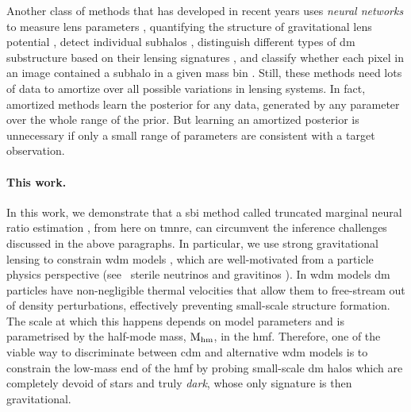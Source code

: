 Another class of methods that has developed in recent years uses \emph{neural networks} to measure lens parameters \cite{Hezaveh:2017sht, PerreaultLevasseur:2017ltk,  Morningstar:2019szx}, quantifying the structure of gravitational lens potential \cite{Vernardos:2020aa}, detect individual subhalos \cite{Rivero:2020aa}, distinguish different types of \gls*{dm} substructure based on their lensing signatures \cite{Alexander:2019puy}, and classify whether each pixel in an image contained a subhalo in a given mass bin \cite{Ostdiek:2020cqz,Ostdiek:2020mvo}. Still, these methods need lots of data to amortize over all possible variations in lensing systems. In fact, amortized methods learn the posterior for any data, generated by any parameter over the whole range of the prior. But learning an amortized posterior is unnecessary if only a small range of parameters are consistent with a target observation.
 

\paragraph*{This work.} In this work, we demonstrate that a \gls*{sbi} \cite{Cranmer:2019eaq} method called truncated marginal neural ratio estimation \cite{Miller:2020hua,Miller:2021aa}, from here on \gls*{tmnre}, can circumvent the inference challenges discussed in the above paragraphs. 
In particular, we use strong gravitational lensing to constrain \gls*{wdm} models \cite{Colin:2000dn, Lovell:2013ola}, which are well-motivated from a particle physics perspective (see \eg~sterile neutrinos \cite{Boyarsky:2018tvu} and gravitinos \cite{Bond:1982uy}). In \gls*{wdm} models \gls*{dm} particles have non-negligible thermal velocities that allow them to free-stream out of density perturbations, effectively preventing small-scale structure formation. The scale at which this happens depends on model parameters and is parametrised by the half-mode mass, $\mathrm{M_{hm}}$, in the \gls*{hmf}. Therefore, one of the viable way to discriminate between \gls*{cdm} and alternative \gls*{wdm} models is to constrain the low-mass end of the \gls*{hmf} by probing small-scale \gls*{dm} halos which are completely devoid of stars and truly \emph{dark}, whose only signature is then gravitational. 

